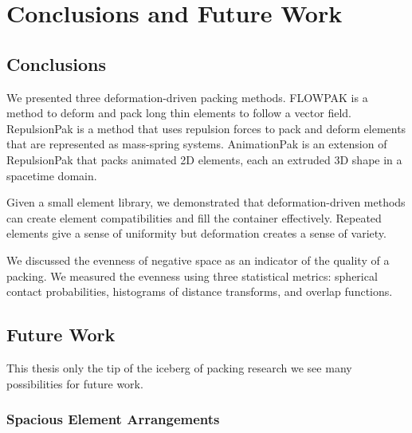 
\chapter{Conclusions and Future Work}
\label{chapter_conclusions_and_future_work}

\section{Conclusions}

\newtext
{
We presented three deformation-driven packing methods.
FLOWPAK is a method to deform and pack long thin elements to follow a vector field.
RepulsionPak is a method that uses repulsion forces to pack and deform
elements that are represented as mass-spring systems.
AnimationPak is an extension of RepulsionPak that packs animated 2D elements,
each an extruded 3D shape in a spacetime domain.
}

\newtext
{
Given a small element library, 
we demonstrated that deformation-driven methods can create element compatibilities
and fill the container effectively.
Repeated elements give a sense of uniformity but deformation creates a sense of variety.
}

\newtext
{We discussed the evenness of negative space as an indicator of the quality of a packing.
We measured the evenness using three statistical metrics:
spherical contact probabilities, histograms of distance transforms, and overlap functions.
}

\section{Future Work}

\newtext
{
This thesis  only the tip of the iceberg of packing research 
we see many possibilities for future work.
}

\subsection{Spacious Element Arrangements}

